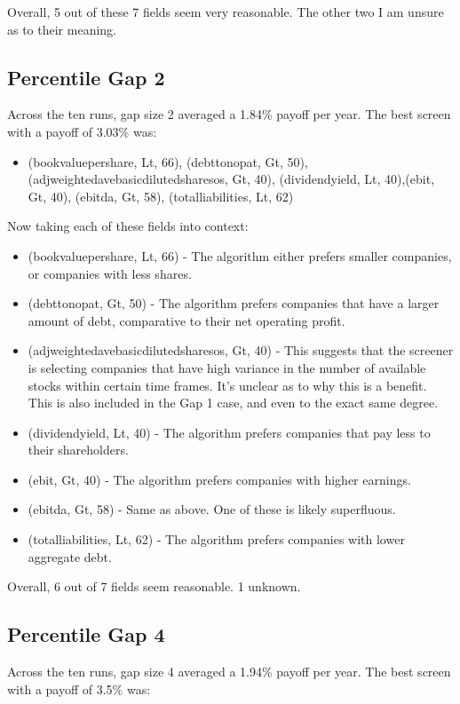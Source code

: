 Overall, 5 out of these 7 fields seem very reasonable. The other two I am unsure as to their meaning.

\subsection{Percentile Gap 2}
Across the ten runs, gap size 2 averaged a 1.84\% payoff per year. The best screen with a payoff of 3.03\% was:

\begin{itemize}
    \item (bookvaluepershare, Lt, 66), (debttonopat, Gt, 50),\newline (adjweightedavebasicdilutedsharesos, Gt, 40), (dividendyield, Lt, 40),\newline (ebit, Gt, 40), (ebitda, Gt, 58), (totalliabilities, Lt, 62)
\end{itemize}

Now taking each of these fields into context:
\begin{itemize}
    \item (bookvaluepershare, Lt, 66) - The algorithm either prefers smaller companies, or companies with less shares.
    \item (debttonopat, Gt, 50) - The algorithm prefers companies that have a larger amount of debt, comparative to their net operating profit.
    \item (adjweightedavebasicdilutedsharesos, Gt, 40) - This suggests that the screener is selecting companies that have high variance in the number of available stocks within certain time frames. It's unclear as to why this is a benefit. This is also included in the Gap 1 case, and even to the exact same degree.
    \item (dividendyield, Lt, 40) - The algorithm prefers companies that pay less to their shareholders.
    \item (ebit, Gt, 40) - The algorithm prefers companies with higher earnings.
    \item (ebitda, Gt, 58) - Same as above. One of these is likely superfluous.
    \item (totalliabilities, Lt, 62) - The algorithm prefers companies with lower aggregate debt.
\end{itemize}

Overall, 6 out of 7 fields seem reasonable. 1 unknown.

\subsection{Percentile Gap 4}
Across the ten runs, gap size 4 averaged a 1.94\% payoff per year. The best screen with a payoff of 3.5\% was:


